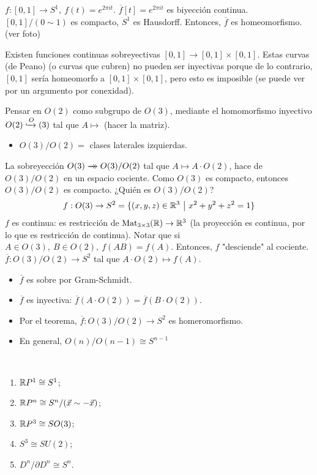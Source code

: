 \begin{eg}
	$f : [0,1] \to S^1,\ f(t) = e^{2 \pi i t}$. $\overline{f}[t] = e^{2 \pi i t}$ es biyección continua. $[0,1] / (0 \sim 1)$ es compacto, $S^1$ es Hausdorff. Entonces, $\overline{f}$ es homeomorfismo. (ver foto)
\end{eg}

\begin{eg}
	Existen funciones continuas sobreyectivas $[0,1] \to [0,1] \times [0,1]$. Estas curvas (de Peano) (o curvas que cubren) no pueden ser inyectivas porque de lo contrario, $[0,1]$ sería homeomorfo a $[0,1] \times [0,1]$, pero esto es imposible (se puede ver por un argumento por conexidad).
\end{eg}

\begin{eg}
	Pensar en $O(2)$ como subgrupo de $O(3)$, mediante el homomorfismo inyectivo $O(2) \xhookrightarrow O(3)$ tal que $A \mapsto$ (hacer la matriz).
	\begin{itemize}
		\item $O(3) / O(2) =$ clases laterales izquierdas.
	\end{itemize}
	La sobreyección $O(3) \xrightarrow[]{}\mathrel{\mkern-14mu}\rightarrow O(3) / O(2)$ tal que $A \mapsto A\cdot O(2)$, hace de $O(3) / O(2)$ en un espacio cociente. Como $O(3)$ es compacto, entonces $O(3) / O(2)$ es compacto. ¿Quién es $O(3) / O(2)$?
	\[ f : O(3) \to S^2 = \{(x,y,z) \in \R^3 \ \big| \ x^2 + y^2 + z^2 = 1\} \]
	$f$ es continua: es restricción de $\operatorname{Mat}_{3 \times 3}(\mathbb{R}) \to \mathbb{R}^3$ (la proyección es continua, por lo que es restricción de continua). Notar que si $A \in O(3),\ B \in O(2),\ f(AB) = f(A)$. Entonces, $f$ "desciende" al cociente. $\overline{f} : O(3) / O(2) \to S^2$ tal que $A \cdot O(2) \mapsto f(A)$.
	\begin{itemize}
		\item $\overline{f}$ es sobre por Gram-Schmidt.
		
		\item $\overline{f}$ es inyectiva: $\overline{f}(A \cdot O(2)) = \overline{f}(B \cdot O(2))$.
		
		\item Por el teorema, $\overline{f} : O(3) / O(2) \to S^2$ es homeromorfismo.

		\item En general, $O(n) / O(n-1) \cong S^{n-1}$
	\end{itemize}
\end{eg}

\begin{eg}[pensar]~
	\begin{enumerate}
		\item $\mathbb{R} P^1 \cong S^1$;

		\item $\mathbb{R} P^n \cong S^n / (\vec{x} \sim -\vec{x})$;

		\item $\mathbb{R} P^3 \cong SO(3)$;

		\item $S^3 \cong SU(2)$;

		\item $D^n / \partial D^n \cong S^n$.
	\end{enumerate}
\end{eg}
